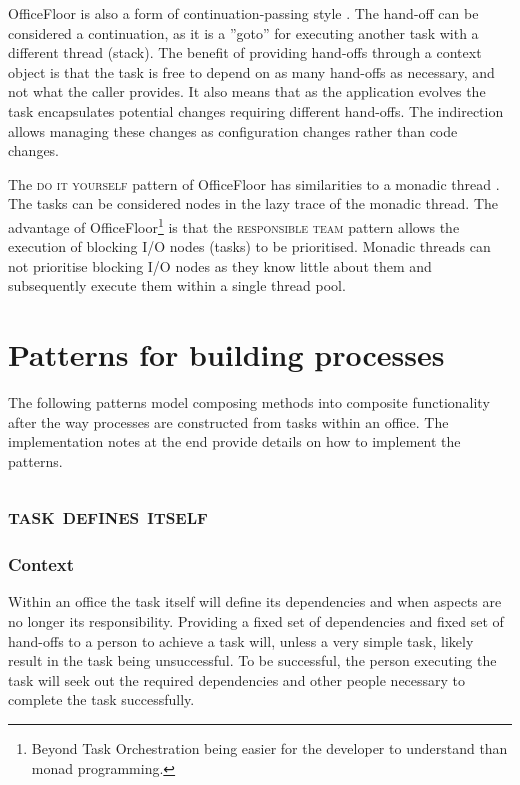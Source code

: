 \documentclass[prodmode]{style/acmlarge}
\begin{document}
OfficeFloor is also a form of continuation-passing style \cite{continuations}. 
The hand-off can be considered a continuation, as it is a ''goto'' for executing
another task with a different thread (stack).  The benefit of providing
hand-offs through a context object is that the task is free to depend on as many
hand-offs as necessary, and not what the caller provides.  It also means that as
the application evolves the task encapsulates potential changes requiring
different hand-offs.  The indirection allows managing these changes as
configuration changes rather than code changes.

The \textsc{do it yourself} pattern of OfficeFloor has similarities to a monadic
thread \cite{monadic-thread}.  The tasks can be considered nodes in the lazy
trace of the monadic thread.  The advantage of OfficeFloor\footnote{Beyond Task
Orchestration being easier for the developer to understand than monad
programming.} is that the \textsc{responsible team} pattern allows the execution
of blocking I/O nodes (tasks) to be prioritised.  Monadic threads can not
prioritise blocking I/O nodes as they know little about them and subsequently
execute them within a single thread pool.




\section{Patterns for building processes}

The following patterns model composing methods into composite functionality
after the way processes are constructed from tasks within an office.  The
implementation notes at the end provide details on how to implement the
patterns.


\subsection{\textsc{\textbf{task defines itself}}}

\subsubsection*{Context} Within an office the task itself will define its
dependencies and when aspects are no longer its responsibility.  Providing a
fixed set of dependencies and fixed set of hand-offs to a person to achieve a
task will, unless a very simple task, likely result in the task being
unsuccessful.  To be successful, the person executing the task will seek out the
required dependencies and other people necessary to complete the task
successfully.
\end{document}
